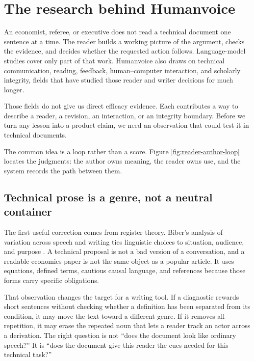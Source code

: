 \chapter{The research behind Humanvoice}
\label{ch:literature-foundations}

An economist, referee, or executive does not read a technical document one
sentence at a time. The reader builds a working picture of the argument, checks
the evidence, and decides whether the requested action follows. Language-model
studies cover only part of that work. Humanvoice also draws on technical
communication, reading, feedback, human--computer interaction, and scholarly
integrity, fields that have studied those reader and writer decisions for much
longer.

Those fields do not give us direct efficacy evidence. Each contributes a way to
describe a reader, a revision, an interaction, or an integrity boundary. Before
we turn any lesson into a product claim, we need an observation that could test
it in technical documents.

The common idea is a loop rather than a score. Figure
\ref{fig:reader-author-loop} locates the judgments: the author owns meaning,
the reader owns use, and the system records the path between them.

\hvFigureReaderLoop

\section{Technical prose is a genre, not a neutral container}
\label{sec:lit-genre}

The first useful correction comes from register theory. Biber's analysis of
variation across speech and writing ties linguistic choices to situation,
audience, and purpose
\citep{biber1988variation}. A technical proposal is not a bad version of a
conversation, and a readable economics paper is not the same object as a
popular article. It uses equations, defined terms, cautious causal language,
and references because those forms carry specific obligations.

That observation changes the target for a writing tool. If a diagnostic rewards
short sentences without checking whether a definition has been separated from
its condition, it may move the text toward a different genre. If it removes
all repetition, it may erase the repeated noun that lets a reader track an
actor across a derivation. The right question is not ``does the document look
like ordinary speech?'' It is ``does the document give this reader the cues
needed for this technical task?''

